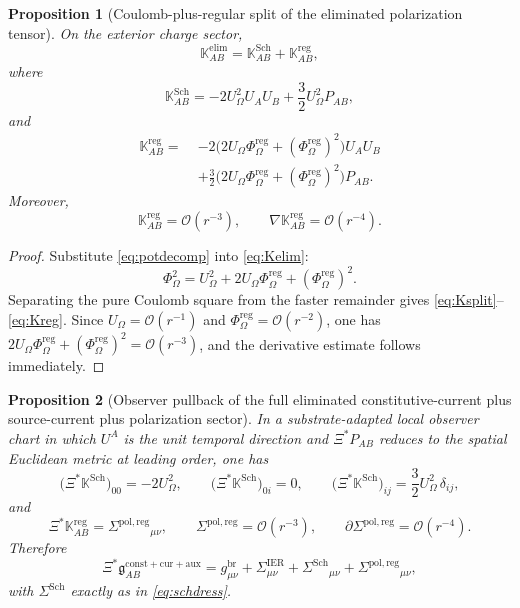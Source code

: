 \documentclass[11pt]{article}
\newcommand{\BridgeMetric}{\mathfrak g}
\newcommand{\ObserverMap}{\Xi}
\newcommand{\ProjSub}{P}
\newcommand{\FlowPot}{\Phi_\Omega}
\newcommand{\FlowPotReg}{\Phi_\Omega^{\mathrm{reg}}}
\newcommand{\CoulPot}{U_\Omega}
\newcommand{\SigmaIER}{\Sigma^{\mathrm{IER}}}
\newcommand{\SigmaDressSch}{\Sigma^{\mathrm{Sch}}}
\newcommand{\SigmaRegPol}{\Sigma^{\mathrm{pol,reg}}}
\newcommand{\AuxPol}{\mathbb K}
\newtheorem{proposition}{Proposition}
\begin{document}
\begin{proposition}[Coulomb-plus-regular split of the eliminated polarization tensor]
\label{prop:split}
On the exterior charge sector,
\begin{equation}
\AuxPol_{AB}^{\mathrm{elim}}
=
\AuxPol_{AB}^{\mathrm{Sch}}
+\AuxPol_{AB}^{\mathrm{reg}},
\label{eq:Ksplit}
\end{equation}
where
\begin{equation}
\AuxPol_{AB}^{\mathrm{Sch}}
=
-2\CoulPot^2U_AU_B
+\frac32\CoulPot^2\ProjSub_{AB},
\label{eq:Ksch}
\end{equation}
and
\begin{align}
\AuxPol_{AB}^{\mathrm{reg}}
=\;&
-2\bigl(2\CoulPot\FlowPotReg+(\FlowPotReg)^2\bigr)U_AU_B
\nonumber\\
&+\frac32\bigl(2\CoulPot\FlowPotReg+(\FlowPotReg)^2\bigr)\ProjSub_{AB}.
\label{eq:Kreg}
\end{align}
Moreover,
\begin{equation}
\AuxPol_{AB}^{\mathrm{reg}}=\mathcal O(r^{-3}),
\qquad
\nabla\AuxPol_{AB}^{\mathrm{reg}}=\mathcal O(r^{-4}).
\label{eq:Kregdecay}
\end{equation}
\end{proposition}

\begin{proof}
Substitute \eqref{eq:potdecomp} into \eqref{eq:Kelim}:
\[
\FlowPot^2=\CoulPot^2+2\CoulPot\FlowPotReg+(\FlowPotReg)^2.
\]
Separating the pure Coulomb square from the faster remainder gives \eqref{eq:Ksplit}--\eqref{eq:Kreg}. Since \(\CoulPot=\mathcal O(r^{-1})\) and \(\FlowPotReg=\mathcal O(r^{-2})\), one has \(2\CoulPot\FlowPotReg+(\FlowPotReg)^2=\mathcal O(r^{-3})\), and the derivative estimate follows immediately.
\end{proof}

\begin{proposition}[Observer pullback of the full eliminated constitutive-current plus source-current plus polarization sector]
\label{prop:pullback}
In a substrate-adapted local observer chart in which \(U^A\) is the unit temporal direction and \(\ObserverMap^\ast\ProjSub_{AB}\) reduces to the spatial Euclidean metric at leading order, one has
\begin{equation}
\bigl(\ObserverMap^\ast\AuxPol^{\mathrm{Sch}}\bigr)_{00}
=
-2\CoulPot^2,
\qquad
\bigl(\ObserverMap^\ast\AuxPol^{\mathrm{Sch}}\bigr)_{0i}
=
0,
\qquad
\bigl(\ObserverMap^\ast\AuxPol^{\mathrm{Sch}}\bigr)_{ij}
=
\frac32\CoulPot^2\,\delta_{ij},
\label{eq:pullsch}
\end{equation}
and
\begin{equation}
\ObserverMap^\ast\AuxPol_{AB}^{\mathrm{reg}}
=
\SigmaRegPol{}_{\mu\nu},
\qquad
\SigmaRegPol=\mathcal O(r^{-3}),
\qquad
\partial\SigmaRegPol=\mathcal O(r^{-4}).
\label{eq:pullreg}
\end{equation}
Therefore
\begin{equation}
\ObserverMap^\ast \BridgeMetric_{AB}^{\mathrm{const+cur+aux}}
=
g_{\mu\nu}^{\mathrm{br}}
+\SigmaIER_{\mu\nu}
+\SigmaDressSch{}_{\mu\nu}
+\SigmaRegPol{}_{\mu\nu},
\label{eq:targetrecovered}
\end{equation}
with \(\SigmaDressSch\) exactly as in \eqref{eq:schdress}.
\end{proposition}
\end{document}
